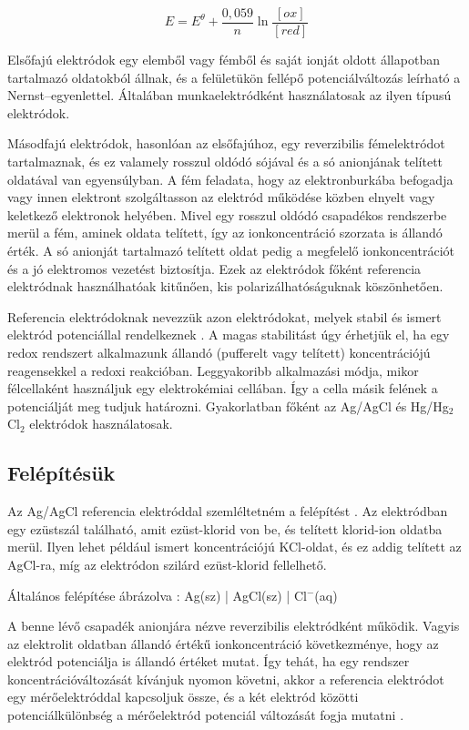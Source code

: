 \begin{equation}
E = E^\theta + \frac{0,059}{n}\ln \frac{[ox]}{[red]}
\label{eq:nernst}
\end{equation}

Elsőfajú elektródok egy elemből vagy fémből és saját ionját oldott állapotban tartalmazó oldatokból állnak, és a felületükön fellépő potenciálváltozás leírható a Nernst--egyenlettel. Általában munkaelektródként használatosak az ilyen típusú elektródok.

Másodfajú elektródok, hasonlóan az elsőfajúhoz, egy reverzibilis fémelektródot tartalmaznak, és ez valamely rosszul oldódó sójával és a só anionjának telített oldatával van egyensúlyban. A fém feladata, hogy az elektronburkába befogadja vagy innen elektront szolgáltasson az elektród működése közben elnyelt vagy keletkező elektronok helyében. Mivel egy rosszul oldódó csapadékos rendszerbe merül a fém, aminek oldata telített, így az ionkoncentráció szorzata is állandó érték. A só anionját tartalmazó telített oldat pedig a megfelelő ionkoncentrációt és a jó elektromos vezetést biztosítja. Ezek az elektródok főként referencia elektródnak használhatóak kitűnően, kis polarizálhatóságuknak köszönhetően.

Referencia elektródoknak nevezzük azon elektródokat, melyek stabil és ismert elektród potenciállal rendelkeznek \cite{allen2001electrochemical}. A magas stabilitást úgy érhetjük el, ha egy redox rendszert alkalmazunk állandó (pufferelt vagy telített) koncentrációjú reagensekkel a redoxi reakcióban. Leggyakoribb alkalmazási módja, mikor félcellaként használjuk egy elektrokémiai cellában. Így a cella másik felének a potenciálját meg tudjuk határozni. Gyakorlatban főként az Ag/AgCl és Hg/Hg$_2$Cl$_2$ elektródok használatosak. 

\subsection{Felépítésük}

Az Ag/AgCl referencia elektróddal szemléltetném a felépítést \cite{janz1968silver}. Az elektródban egy ezüstszál található, amit ezüst-klorid von be, és telített klorid-ion oldatba merül. Ilyen lehet például ismert koncentrációjú KCl-oldat, és ez addig telített az AgCl-ra, míg az elektródon szilárd ezüst-klorid fellelhető.


Általános felépítése ábrázolva : Ag(sz) | AgCl(sz) | Cl$^-$(aq)


A benne lévő csapadék anionjára nézve reverzibilis elektródként működik. Vagyis az elektrolit oldatban állandó értékű ionkoncentráció következménye, hogy az elektród potenciálja is állandó értéket mutat. Így tehát, ha egy rendszer koncentrációváltozását kívánjuk nyomon követni, akkor a referencia elektródot egy mérőelektróddal kapcsoljuk össze, és a két elektród közötti potenciálkülönbség a mérőelektród potenciál változását fogja mutatni \cite{harris2010quantitative}.

